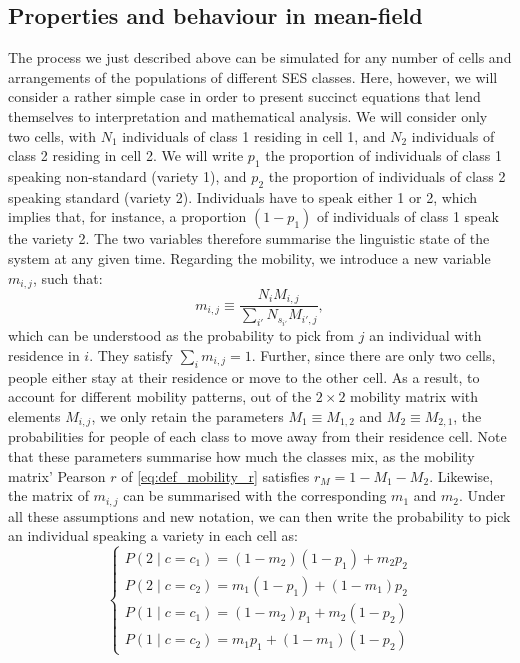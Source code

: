 \documentclass[../thesis.tex]{subfiles}
\begin{document}
\subsection{Properties and behaviour in mean-field}
 The process we just described
above can be simulated for any number of cells and arrangements of the populations of
different \ac{SES} classes. Here, however, we will consider a rather simple case in
order to present succinct equations that lend themselves to interpretation and
mathematical analysis. We will consider only two cells, with $N_1$ individuals of class
1 residing in cell 1, and $N_2$ individuals of class 2 residing in cell 2. We will write
$p_1$ the proportion of individuals of class 1 speaking non-standard (variety 1), and
$p_2$ the proportion of individuals of class 2 speaking standard (variety 2).
Individuals have to speak either 1 or 2, which implies that, for instance, a proportion
$(1 - p_1)$ of individuals of class 1 speak the variety 2. The two variables therefore
summarise the linguistic state of the system at any given time. Regarding the mobility,
we introduce a new variable $m_{i, j}$, such that:
\begin{equation}
  m_{i, j} \equiv \frac{N_{i} M_{i, j}}{\sum_{i'} N_{s_{i'}} M_{i', j}},
\end{equation}
which can be understood as the probability to pick from $j$ an individual with residence
in $i$. They satisfy $\sum_i m_{i, j} = 1$. Further, since there are only two cells,
people either stay at their residence or move to the other cell. As a result, to account
for different mobility patterns, out of the $2 \times 2$ mobility matrix with elements
$M_{i, j}$, we only retain the parameters $M_1 \equiv M_{1, 2}$ and $M_2 \equiv M_{2,
1}$, the probabilities for people of each class to move away from their residence cell.
Note that these parameters summarise how much the classes mix, as the mobility
matrix' Pearson $r$ of \cref{eq:def_mobility_r} satisfies $r_M = 1 - M_1 - M_2$. Likewise,
the matrix of $m_{i, j}$ can be summarised with the corresponding $m_1$ and $m_2$. Under
all these assumptions and new notation, we can then write the probability to pick an
individual speaking a variety in each cell as:
\begin{equation}
  \left\{
  \begin{aligned}
      P(2 \mid c = c_1)
          = (1 - m_2) (1 - p_1) + m_2 p_2
      \\
      P(2 \mid c = c_2)
          = m_1 (1 - p_1) + (1 - m_1) p_2
      \\
      P(1 \mid c = c_1)
          = (1 - m_2) p_1 + m_2 (1 - p_2)
      \\
      P(1 \mid c = c_2)
          = m_1 p_1 + (1 - m_1) (1 - p_2)
  \end{aligned}
  \right.
\end{equation}
\end{document}
